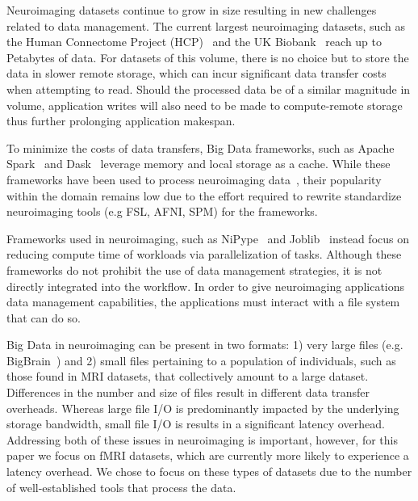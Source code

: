     Neuroimaging datasets continue to grow in size resulting in new challenges
    related to data management. The current largest neuroimaging datasets, such
    as the Human Connectome Project (HCP)~\cite{HCP} and the UK
    Biobank~\cite{ukbiobank} reach up to Petabytes of data. For datasets of this
    volume, there is no choice but to store the data in slower remote storage,
    which can incur significant data transfer costs when attempting to read.
    Should the processed data be of a similar magnitude in volume, application
    writes will also need to be made to compute-remote storage thus further
    prolonging application makespan. 

    To minimize the costs of data transfers, Big Data frameworks, such as Apache
    Spark~\cite{zaharia2016apache} and Dask~\cite{rocklin2015dask} leverage
    memory and local storage as a cache. While these frameworks have been used
    to process neuroimaging data~\cite{manypapers}, their popularity within the
    domain remains low due to the effort required to rewrite standardize
    neuroimaging tools (e.g FSL, AFNI, SPM) for the frameworks. 
    
    Frameworks used in neuroimaging, such as NiPype~\cite{nipype} and
    Joblib~\cite{joblib} instead focus on reducing compute time of workloads via parallelization of tasks.
    Although these
    frameworks do not prohibit the use of data management strategies, it is not
    directly integrated into the workflow. In order to give neuroimaging
    applications data management capabilities, the applications must interact
    with a file system that can do so.

    Big Data in neuroimaging can be present in two formats: 1) very large files (e.g. BigBrain~\cite{amunts2013bigbrain}) and
    2) small files pertaining to a population of individuals, such as those found in MRI datasets, that collectively
    amount to a large dataset. Differences in the number and size of files result in different data transfer overheads.
    Whereas large file I/O is predominantly impacted by the underlying storage bandwidth, small file I/O is results in a
    significant latency overhead. Addressing both of these issues in neuroimaging is important, however, for this paper
    we focus on fMRI datasets, which are currently more likely to experience a latency overhead. We chose to focus
    on these types of datasets due to the number of well-established tools that process the data.

